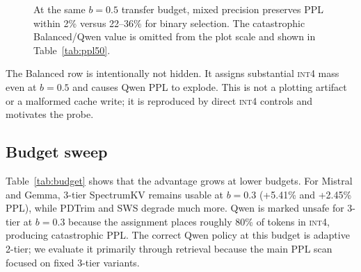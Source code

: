 \documentclass[11pt]{article}
\newcommand{\method}{SpectrumKV}
\newcommand{\budget}{b}
\newcommand{\pct}{\%}
\newcommand{\intiv}{\textsc{int4}}
\theoremstyle{plain}
\theoremstyle{definition}
\begin{document}
\begin{figure}[t]
\centering
{}
\caption{At the same $\budget=0.5$ transfer budget, mixed precision preserves PPL within 2\% versus 22--36\% for binary selection.  The catastrophic Balanced/Qwen value is omitted from the plot scale and shown in Table~\ref{tab:ppl50}.}
\label{fig:ppl50}
\end{figure}

The Balanced row is intentionally not hidden.  It assigns substantial \intiv{} mass even at $\budget=0.5$ and causes Qwen PPL to explode.  This is not a plotting artifact or a malformed cache write; it is reproduced by direct \intiv{} controls and motivates the probe.

\subsection{Budget sweep}
\label{sec:rq8}

Table~\ref{tab:budget} shows that the advantage grows at lower budgets.  For Mistral and Gemma, 3-tier \method{} remains usable at $\budget=0.3$ (+5.41\pct{} and +2.45\pct{} PPL), while PDTrim and SWS degrade much more.  Qwen is marked unsafe for 3-tier at $\budget=0.3$ because the assignment places roughly 80\pct{} of tokens in \intiv{}, producing catastrophic PPL.  The correct Qwen policy at this budget is adaptive 2-tier; we evaluate it primarily through retrieval because the main PPL scan focused on fixed 3-tier variants.
\end{document}
